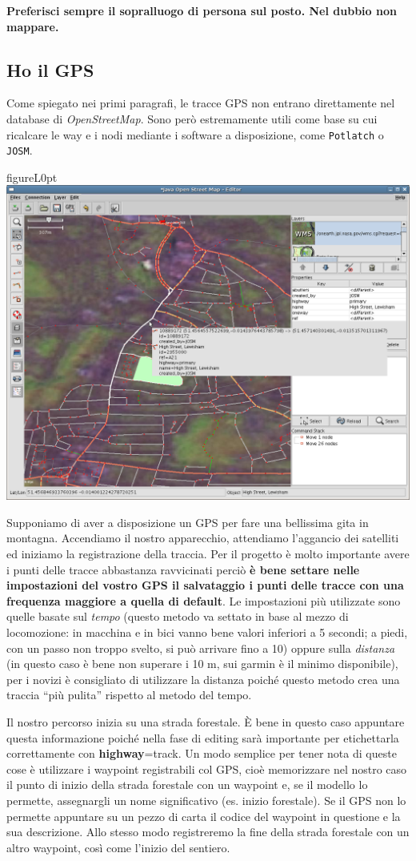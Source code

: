 \documentclass[a4paper,twoside,12pt,]{article}
\newcommand{\osm}{\emph{OpenStreetMap}\xspace}
\newcommand{\gps}{GPS\xspace}
\newcommand{\key}[1]{\textsf{\textbf{#1}}}
\newcommand{\val}[1]{\textsf{#1}}
\newcommand{\soft}[1]{\texttt{#1}}
\begin{document}
\textbf{Preferisci sempre il sopralluogo di persona sul posto. Nel dubbio non mappare.}
\subsection{Ho il \gps}
Come spiegato nei primi paragrafi, le tracce \gps non entrano direttamente nel database di \osm. Sono però estremamente utili come base su cui ricalcare le way e i nodi mediante i software a disposizione, come \soft{Potlatch} o \soft{JOSM}.
\begin{wrapfloat}{figure}{L}{0pt}
 \includegraphics[width=0.6\columnwidth]{Josm-screenshot.png}
 \caption{\textit{L'interfaccia di JOSM}}
\end{wrapfloat}
Supponiamo di aver a disposizione un \gps per fare una bellissima gita in montagna. Accendiamo il nostro apparecchio, attendiamo l'aggancio dei satelliti ed iniziamo la registrazione della traccia. Per il progetto è molto importante avere i punti delle tracce abbastanza ravvicinati perciò \textbf{è bene settare nelle impostazioni del vostro \gps il salvataggio i punti delle tracce con una frequenza maggiore a quella di default}. Le impostazioni più utilizzate sono quelle basate sul \textit{tempo} (questo metodo va settato in base al mezzo di locomozione: in macchina e in bici vanno bene valori inferiori a 5 secondi; a piedi, con un passo non troppo svelto, si può arrivare fino a 10) oppure sulla \textit{distanza} (in questo caso è bene non superare i 10 m, sui garmin è il minimo disponibile), per i novizi è consigliato di utilizzare la distanza poiché questo metodo crea una traccia ``più pulita'' rispetto al metodo del tempo.

Il nostro percorso inizia su una strada forestale. È bene in questo caso appuntare questa informazione poiché nella fase di editing sarà importante per etichettarla correttamente con \key{highway}=\val{track}. Un modo semplice per tener nota di queste cose è utilizzare i waypoint registrabili col \gps, cioè memorizzare nel nostro caso il punto di inizio della strada forestale con un waypoint e, se il modello lo permette, assegnargli un nome significativo (es. inizio forestale). Se il \gps non lo permette appuntare su un pezzo di carta il codice del waypoint in questione e la sua descrizione. Allo stesso modo registreremo la fine della strada forestale con un altro waypoint, così come l'inizio del sentiero.
\end{document}
